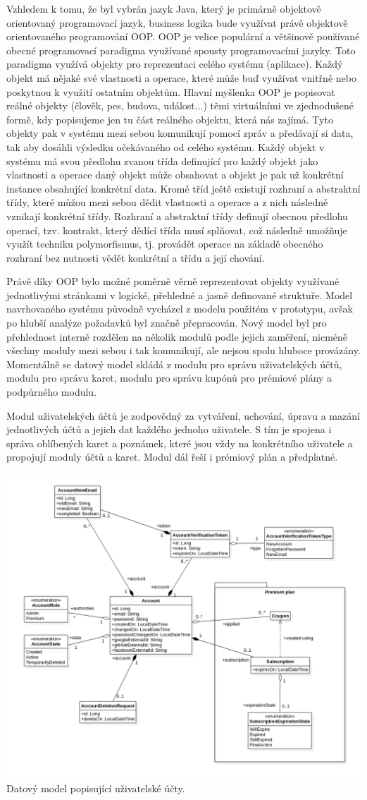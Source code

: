 \begin{itemize}
\begin{itemize}
		Vzhledem k tomu, že byl vybrán jazyk Java, který je primárně objektově orientovaný programovací jazyk, business
		logika bude využívat právě objektově orientovaného programování \ac{OOP}.
		\ac{OOP} je velice populární a většinově používané obecné programovací paradigma využívané spousty programovacími
		jazyky.
		Toto paradigma využívá objekty pro reprezentaci celého systému (aplikace).
		Každý objekt má nějaké své vlastnosti a operace, které může buď využívat vnitřně nebo poskytnou k využití ostatním
		objektům.
		Hlavní myšlenka \ac{OOP} je popisovat reálné objekty (člověk, pes, budova, událost...) těmi virtuálními ve zjednodušené
		formě, kdy popisujeme jen tu část reálného objektu, která nás zajímá.
		Tyto objekty pak v systému mezi sebou komunikují pomocí zpráv a předávají si data, tak aby dosáhli výsledku
		očekávaného od celého systému.
		Každý objekt v systému má svou předlohu zvanou třída definující pro každý objekt jako vlastnosti a operace daný objekt
		může obsahovat a objekt je pak už konkrétní instance obsahující konkrétní data.
		Kromě tříd ještě existují rozhraní a abstraktní třídy, které můžou mezi sebou dědit vlastnosti a operace a z nich
		následně vznikají konkrétní třídy.
		Rozhraní a abstraktní třídy definují obecnou předlohu operací, tzv. kontrakt, který dědící třída musí splňovat, což
		následně umožňuje využít techniku polymorfismus, tj. provádět operace na základě obecného rozhraní bez nutnosti
		vědět konkrétní a třídu a její chování.
		\cite{oop}

		Právě díky \ac{OOP} bylo možné poměrně věrně reprezentovat objekty využívané jednotlivými stránkami v logické,
		přehledné a jasně definované struktuře.
		Model navrhovaného systému původně vycházel z modelu použitém v prototypu, avšak po hlubší analýze požadavků byl
		značně přepracován.
		Nový model byl pro přehlednost interně rozdělen na několik modulů podle jejich zaměření, nicméně všechny moduly
		mezi sebou i tak komunikují, ale nejsou spolu hluboce provázány.
		Momentálně se datový model skládá z modulu pro správu uživatelských účtů, modulu pro správu karet, modulu pro správu
		kupónů pro prémiové plány a podpůrného modulu.

		Modul uživatelských účtů je zodpovědný za vytváření, uchování, úpravu a mazání jednotlivých účtů a jejich dat
		každého jednoho uživatele.
		S tím je spojena i správa oblíbených karet a poznámek, které jsou vždy na konkrétního uživatele a propojují
		moduly účtů a karet.
		Modul dál řeší i prémiový plán a předplatné.

		\includegraphics[width=0.24\linewidth]{obrazky/datovy_model_ucet}\hfill
		Datový model popisující uživatelské účty. %


\end{itemize}
\end{itemize}
